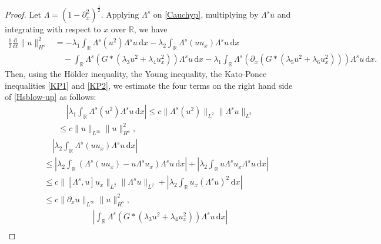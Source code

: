 \documentclass[10pt,a4paper]{amsart}
\begin{document}
\begin{proof}
Let $\Lambda=(1-\partial_x^2)^{\tfrac{1}{2}}$. Applying $\Lambda^s$ on \eqref{Cauchyp}, multiplying by
$\Lambda^s u$ and integrating with respect to $x$ over $\mathbb{R}$, we have
\begin{equation}\label{Hsblow-up}
\begin{aligned}
\frac{1}{2}\frac{\mathrm{d}}{\mathrm{d}t}\|u\|_{H^s}^2
&=-\lambda_1\int_{\mathbb{R}}\Lambda^s( u^2)\Lambda^su \,\mathrm{d}x
-\lambda_2\int_{\mathbb{R}}\Lambda^s( u u_x)\Lambda^su \,\mathrm{d}x \\
&\quad-\int_{\mathbb{R}}\Lambda^s( G\ast(\lambda_3 u^2 + \lambda_4 u_x^2))\Lambda^su \,\mathrm{d}x
-\lambda_1\int_{\mathbb{R}}\Lambda^s( \partial_x \left(  G \ast (\lambda_5 u^2 + \lambda_6 u_x^2) \right))\Lambda^su \,\mathrm{d}x.
\end{aligned}
\end{equation}
Then, using the H\"{o}lder inequality, the Young inequality, the Kato-Ponce inequalities \eqref{KP1} and \eqref{KP2}, we estimate the four terms on the right hand side of \eqref{Hsblow-up} as follows:
\begin{equation}\label{Term1}
\begin{aligned}
&\quad\left|\lambda_1\int_{\mathbb{R}}\Lambda^s( u^2)\Lambda^su \,\mathrm{d}x\right|\leq c\|\Lambda^s(u^2)\|_{L^2}\|\Lambda^su\|_{L^2}\\
&\leq c\|u\|_{L^\infty}\|u\|_{H^s}^2,
\end{aligned}
\end{equation}
\begin{equation}\label{Term2}
\begin{aligned}
&\quad\left|\lambda_2\int_{\mathbb{R}}\Lambda^s( uu_x)\Lambda^su \,\mathrm{d}x\right|\\
&\leq\left|\lambda_2\int_{\mathbb{R}}\left(\Lambda^s( uu_x)- u \Lambda^s u_x\right)\Lambda^su \,\mathrm{d}x\right|+\left|\lambda_2\int_{\mathbb{R}} u \Lambda^s u_x\Lambda^su \,\mathrm{d}x\right|\\
&\leq c\|[\Lambda^s,u]u_x\|_{L^2} \|\Lambda^su\|_{L^2}+\left|\lambda_2\int_{\mathbb{R}} u_x (\Lambda^su)^2 \,\mathrm{d}x\right|\\
&\leq c\|\partial_x u\|_{L^\infty}\|u\|_{H^s}^2,
\end{aligned}
\end{equation}
\begin{equation}\label{Term3}
\begin{aligned}
&\quad\left|\int_{\mathbb{R}}\Lambda^s( G\ast(\lambda_3 u^2 + \lambda_4 u_x^2))\Lambda^su \,\mathrm{d}x\right|\\

\end{aligned}
\end{equation}
\end{proof}
\end{document}
